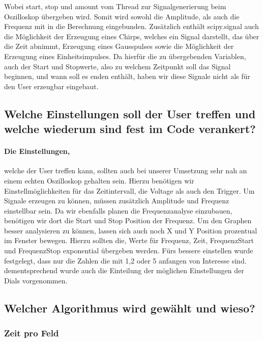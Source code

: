\documentclass{article}
\begin{document}
 Wobei start, stop und amount vom Thread zur Signalgenerierung beim Oszilloskop übergeben wird. Somit wird sowohl die Amplitude, als auch die Frequenz mit in die Berechnung eingebunden. Zusätzlich enthält scipy.signal auch die Möglichkeit der Erzeugung eines Chirps, welches ein Signal darstellt, das über die Zeit abnimmt, Erzeugung eines Gausspulses sowie die Möglichkeit der Erzeugung eines Einheitsimpulses. Da hierfür die zu übergebenden Variablen, auch der Start und Stopwerte, also zu welchem Zeitpunkt soll das Signal beginnen, und wann soll es enden enthält, haben wir diese Signale nicht als für den User erzeugbar eingebaut.
\subsection{Welche Einstellungen soll der User treffen und welche wiederum sind fest im Code verankert?}
\paragraph{Die Einstellungen,}
welche der User treffen kann, sollten auch bei unserer Umsetzung sehr nah an einem echten Oszilloskop gehalten sein.
Hierzu benötigen wir Einstellmöglichkeiten für das Zeitintervall, die Voltage als auch den Trigger. Um Signale erzeugen zu können, müssen zusätzlich Amplitude und Frequenz einstellbar sein. Da wir ebenfalls planen die Frequenzanalyse einzubauen, benötigen wir dort die Start und Stop Position der Frequenz. Um den Graphen besser analysieren zu können, lassen sich auch noch X und Y Position prozentual im Fenster bewegen.
Hierzu sollten die, Werte für Frequenz, Zeit, FrequenzStart und FrequenzStop exponential übergeben werden. Fürs bessere einstellen wurde festgelegt, dass nur die Zahlen die mit 1,2 oder 5 anfangen von Interesse sind. dementsprechend wurde auch die Einteilung der möglichen Einstellungen der Dials vorgenommen.

\subsection{Welcher Algorithmus wird gewählt und wieso?}
\subsubsection{Zeit pro Feld}
\end{document}
